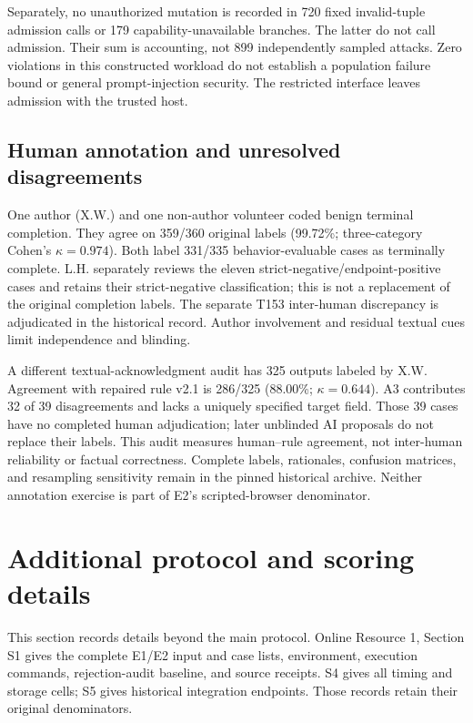 \documentclass[11pt,a4paper]{article}
\begin{document}
Separately, no unauthorized mutation is recorded in 720 fixed invalid-tuple admission calls or 179 capability-unavailable branches. The latter do not call admission. Their sum is accounting, not 899 independently sampled attacks. Zero violations in this constructed workload do not establish a population failure bound or general prompt-injection security. The restricted interface leaves admission with the trusted host.

\subsection{Human annotation and unresolved disagreements}

One author (X.W.) and one non-author volunteer coded benign terminal completion. They agree on 359/360 original labels (99.72\%; three-category Cohen's $\kappa=0.974$). Both label 331/335 behavior-evaluable cases as terminally complete. L.H. separately reviews the eleven strict-negative/endpoint-positive cases and retains their strict-negative classification; this is not a replacement of the original completion labels. The separate T153 inter-human discrepancy is adjudicated in the historical record. Author involvement and residual textual cues limit independence and blinding.

A different textual-acknowledgment audit has 325 outputs labeled by X.W. Agreement with repaired rule v2.1 is 286/325 (88.00\%; $\kappa=0.644$). A3 contributes 32 of 39 disagreements and lacks a uniquely specified target field. Those 39 cases have no completed human adjudication; later unblinded AI proposals do not replace their labels. This audit measures human--rule agreement, not inter-human reliability or factual correctness. Complete labels, rationales, confusion matrices, and resampling sensitivity remain in the pinned historical archive. Neither annotation exercise is part of E2's scripted-browser denominator.

\section{Additional protocol and scoring details}
\label{app:detailed-protocol}

This section records details beyond the main protocol. Online Resource 1, Section S1 gives the complete E1/E2 input and case lists, environment, execution commands, rejection-audit baseline, and source receipts. S4 gives all timing and storage cells; S5 gives historical integration endpoints. Those records retain their original denominators.
\end{document}
